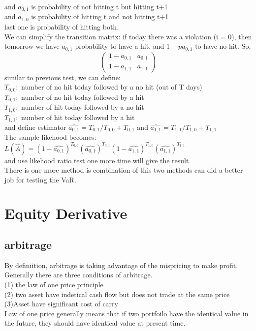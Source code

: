 \documentclass[a4paper,11pt]{article}
\begin{document}
and $a_{0,1}$ is probability of not hitting t but hitting t+1\\
and $a_{1,0}$ is probability of hitting t and not hitting t+1\\
last one is probability of hitting both.\\
We can simplify the transition matrix: if today there was a violation (i = 0), then tomorrow
we have $a_{0,1}$ probability to have a hit, and  $1-pa_{0,1}$  to have no hit. So,
$$
\begin{pmatrix}
1-a_{0,1} & a_{0,1} \\
1-a_{1,1} & a_{1,1}
\end{pmatrix}
$$
similar to previous test, we can define:\\
$T_{0,0}:$ number of no hit today followed by a no hit (out of T days)\\
$T_{0,1}:$ number of no hit today followed by a hit\\
$T_{1,0}:$ number of hit today followed by a no hit\\
$T_{1,1}:$ number of hit today followed by a hit\\
and define estimator $\hat{a_{0,1}}=T_{0,1}/T_{0,0}+T_{0,1}$ and $\hat{a_{1,1}}=T_{1,1}/T_{1,0}+T_{1,1}$\\
The sample likehood becomes:$L(\hat{A})=(1-\hat{a_{0,1}})^{T_{0,0}}(\hat{a_{0,1}})^{T_{0,1}}(1-\hat{a_{1,1}})^{T_{1,0}}(\hat{a_{1,1}})^{T_{1,1}}$\\
and use likehood ratio test one more time will give the result\\
There is one more method is combination of this two methods can did a better job for testing the VaR.
\section{Equity Derivative}
\subsection{arbitrage}
By definiition, arbitrage is taking advantage of the mispricing to make profit. Generally there are three conditions of arbitrage.\\
(1) the law of one price principle\\
(2) two asset have indetical cash flow but does not trade at the same price\\
(3)Asset have significant cost of carry\\
Law of one price generally means that if two portfoilo have the identical value in the future, they should have identical value at present time.\\
\end{document}
